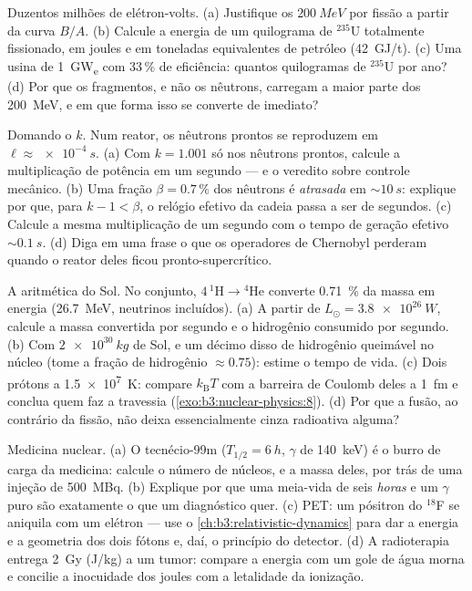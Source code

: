 \begin{exercise}[$\star\star$]\label{exo:b3:nuclear-physics:9}
Duzentos milhões de elétron-volts. (a) Justifique os
$\qty{200}{MeV}$ por fissão a partir da curva $B/A$. (b) Calcule
a energia de um quilograma de $^{235}$U totalmente fissionado, em
joules e em toneladas equivalentes de petróleo
(\qty{42}{GJ/t}). (c) Uma usina de \qty{1}{GW_e} com 33\,\% de
eficiência: quantos quilogramas de $^{235}$U por ano? (d) Por que
os fragmentos, e não os nêutrons, carregam a maior parte dos
\qty{200}{MeV}, e em que forma isso se converte de imediato?
\end{exercise}

\begin{exercise}[$\star\star\star$]\label{exo:b3:nuclear-physics:10}
Domando o $k$. Num reator, os nêutrons prontos se reproduzem em $\ell
\approx \qty{e-4}{s}$. (a) Com $k = 1.001$ só nos nêutrons prontos,
calcule a multiplicação de potência em um segundo --- e o
veredito sobre controle mecânico. (b) Uma fração $\beta =
0.7\,\%$ dos nêutrons é \emph{atrasada} em $\sim\qty{10}{s}$:
explique por que, para $k - 1 < \beta$, o relógio efetivo da cadeia
passa a ser de segundos. (c) Calcule a mesma multiplicação de um segundo
com o tempo de geração efetivo $\sim\qty{0.1}{s}$. (d) Diga
em uma frase o que os operadores de Chernobyl perderam quando o
reator deles ficou pronto-supercrítico.
\end{exercise}

\begin{exercise}[$\star\star\star$]\label{exo:b3:nuclear-physics:11}
A aritmética do Sol. No conjunto, $4\,^1\text{H} \to {}^4\text{He}$
converte \qty{0.71}{\percent} da massa em energia
(\qty{26.7}{MeV}, neutrinos incluídos). (a) A partir de $L_\odot =
\qty{3.8e26}{W}$, calcule a massa convertida por segundo e o
hidrogênio consumido por segundo. (b) Com $\qty{2e30}{kg}$ de Sol,
e um décimo disso de hidrogênio queimável no núcleo (tome a fração de
hidrogênio $\approx0.75$): estime o tempo de vida. (c) Dois prótons a
\qty{1.5e7}{K}: compare $k_{\text{B}}T$ com a barreira de Coulomb
deles a \qty{1}{fm} e conclua quem faz a travessia
(\cref{exo:b3:nuclear-physics:8}). (d) Por que a fusão, ao contrário da
fissão, não deixa essencialmente cinza radioativa alguma?
\end{exercise}

\begin{exercise}[$\star\star\star$]\label{exo:b3:nuclear-physics:12}
Medicina nuclear. (a) O tecnécio-99m ($T_{1/2} = \qty{6}{h}$,
$\gamma$ de \qty{140}{keV}) é o burro de carga da medicina: calcule o
número de núcleos, e a massa deles, por trás de uma injeção de
\qty{500}{MBq}. (b) Explique por que uma meia-vida de seis \emph{horas} e
um $\gamma$ puro são exatamente o que um diagnóstico quer. (c) PET:
um pósitron do $^{18}$F se aniquila com um elétron ---
use o \cref{ch:b3:relativistic-dynamics} para dar a energia e a
geometria dos dois fótons e, daí, o princípio do detector.
(d) A radioterapia entrega \qty{2}{Gy} (\unit{J/kg}) a um tumor:
compare a energia com um gole de água morna e concilie a
inocuidade dos joules com a letalidade da ionização.
\end{exercise}

